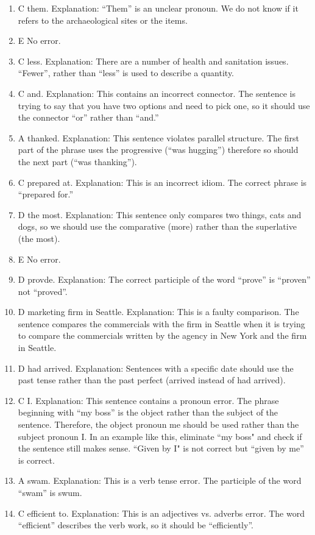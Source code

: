 \begin{enumerate}
\item C them. Explanation: ``Them'' is an unclear pronoun. We do not know if it refers to the archaeological sites or the items. 
\item E No error.
\item C less. Explanation: There are a number of health and sanitation issues. ``Fewer'', rather than ``less'' is used to describe a quantity. 
\item C and. Explanation: This contains an incorrect connector. The sentence is trying to say that you have two options and need to pick one, so it should use the connector ``or'' rather than ``and.''
\item A thanked. Explanation: This sentence violates parallel structure. The first part of the phrase uses the progressive (``was hugging'') therefore so should the next part (``was thanking''). 
\item C prepared at. Explanation: This is an incorrect idiom. The correct phrase is ``prepared for.''
\item D the most. Explanation: This sentence only compares two things, cats and dogs, so we should use the comparative (more) rather than the superlative (the most).
\item E No error. 
\item D provde. Explanation: The correct participle of the word ``prove'' is ``proven'' not ``proved''.
\item D marketing firm in Seattle. Explanation: This is a faulty comparison. The sentence compares the commercials with the firm in Seattle when it is trying to compare the commercials written by the agency in New York and the firm in Seattle.
\item D had arrived. Explanation: Sentences with a specific date should use the past tense rather than the past perfect (arrived instead of had arrived). 
\item C I. Explanation: This sentence contains a pronoun error. The phrase beginning with ``my boss'' is the object rather than the subject of the sentence. Therefore, the object pronoun me should be used rather than the subject pronoun I. In an example like this, eliminate ``my boss" and check if the sentence still makes sense. ``Given by I" is not correct but ``given by me'' is correct. 
\item A swam. Explanation: This is a verb tense error. The participle of the word ``swam'' is swum. 
\item C efficient to. Explanation: This is an adjectives vs. adverbs error. The word ``efficient'' describes the verb work, so it should be ``efficiently''. 

\end{enumerate}
